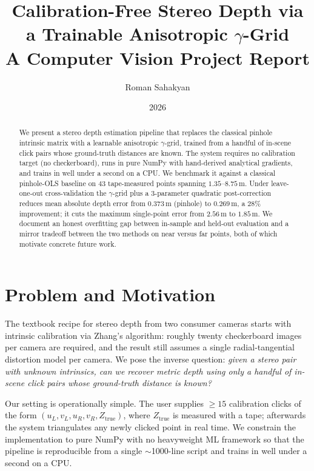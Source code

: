\documentclass[11pt]{article}
\title{Calibration-Free Stereo Depth via a Trainable Anisotropic $\gamma$-Grid\\
\large A Computer Vision Project Report}
\author{Roman Sahakyan}
\date{2026}
\begin{document}
\maketitle

\begin{abstract}
We present a stereo depth estimation pipeline that replaces the classical pinhole intrinsic
matrix with a learnable anisotropic $\gamma$-grid, trained from a handful of in-scene click
pairs whose ground-truth distances are known. The system requires no calibration target
(no checkerboard), runs in pure NumPy with hand-derived analytical gradients, and trains
in well under a second on a CPU. We benchmark it against a classical pinhole-OLS baseline
on $43$ tape-measured points spanning $1.35$–$8.75$\,m. Under leave-one-out cross-validation
the $\gamma$-grid plus a 3-parameter quadratic post-correction reduces mean absolute depth
error from $0.373$\,m (pinhole) to $0.269$\,m, a $28\%$ improvement; it cuts the maximum
single-point error from $2.56$\,m to $1.85$\,m. We document an honest overfitting gap
between in-sample and held-out evaluation and a mirror tradeoff between the two methods on
near versus far points, both of which motivate concrete future work.
\end{abstract}

\section{Problem and Motivation}

The textbook recipe for stereo depth from two consumer cameras starts with intrinsic
calibration via Zhang's algorithm: roughly twenty checkerboard images per camera are
required, and the result still assumes a single radial-tangential distortion model per
camera. We pose the inverse question: \emph{given a stereo pair with unknown intrinsics,
can we recover metric depth using only a handful of in-scene click pairs whose ground-truth
distance is known?}

Our setting is operationally simple. The user supplies $\geq 15$ calibration clicks of
the form $(u_L, v_L, u_R, v_R, Z_\text{true})$, where $Z_\text{true}$ is measured with a
tape; afterwards the system triangulates any newly clicked point in real time. We
constrain the implementation to pure NumPy with no heavyweight ML framework so that the
pipeline is reproducible from a single $\sim$1000-line script and trains in well under a
second on a CPU.
\end{document}
